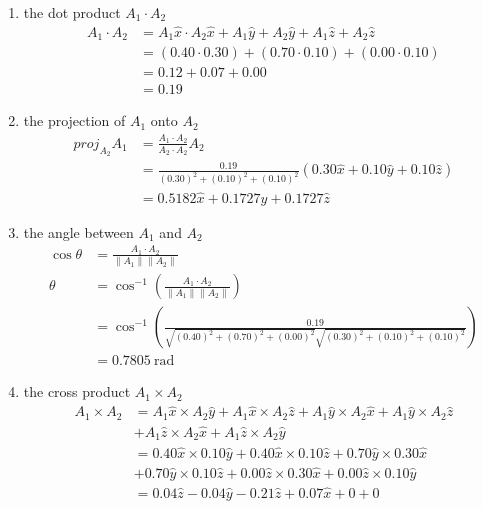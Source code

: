 \documentclass[12pt]{article}
\begin{document}
\begin{enumerate}[label=\alph*)]
    \item the dot product $A_1 \cdot A_2$
    \[
    \begin{aligned}
        A_1 \cdot A_2 &= A_1\hat{x} \cdot A_2\hat{x} + A_1\hat{y} + A_2\hat{y} + A_1\hat{z} + A_2\hat{z} \\
        &= (0.40\cdot 0.30) + (0.70 \cdot 0.10) + (0.00 \cdot 0.10) \\
        &= 0.12 + 0.07 + 0.00 \\
        &= 0.19
    \end{aligned}
    \]
    \item the projection of $A_1$ onto $A_2$ 
    \[
    \begin{aligned}
        proj_{A_2}A_1 &= \frac{A_1 \cdot A_2}{A_2 \cdot A_2} A_2 \\
        &= \frac{0.19}{(0.30)^2+(0.10)^2+(0.10)^2}(0.30\hat{x}+0.10\hat{y}+0.10\hat{z}) \\
        &= 0.5182\hat{x}+0.1727\hat{y}+0.1727\hat{z}
    \end{aligned}    
    \]
    \item the angle between $A_1$ and $A_2$
    \[
    \begin{aligned}
        \cos\theta &= \frac{A_1 \cdot A_2}{\lVert A_1 \rVert \lVert A_2 \rVert} \\
        \theta &= \cos^{-1}\left(\frac{A_1 \cdot A_2}{\lVert A_1 \rVert \lVert A_2 \rVert}\right) \\
        &= \cos^{-1}\left(\frac{0.19}{\sqrt{(0.40)^2+(0.70)^2+(0.00)^2} \sqrt{(0.30)^2+(0.10)^2+(0.10)^2}}\right) \\
        &= 0.7805 \ \text{rad}
    \end{aligned}
    \]
    \item the cross product $A_1 \times A_2$
    \[
    \begin{aligned}
        A_1 \times A_2 &= A_1\hat{x} \times A_2\hat{y} + A_1\hat{x} \times A_2\hat{z} + A_1\hat{y} \times A_2\hat{x} + A_1\hat{y} \times A_2\hat{z} \\ &+ A_1\hat{z} \times A_2\hat{x} + A_1\hat{z} \times A_2\hat{y} \\
        &= 0.40\hat{x} \times 0.10\hat{y} + 0.40\hat{x} \times 0.10\hat{z} + 0.70\hat{y} \times 0.30\hat{x} \\ &+ 0.70\hat{y} \times 0.10\hat{z} + 0.00\hat{z} \times 0.30\hat{x} + 0.00\hat{z} \times 0.10\hat{y} \\
        &= 0.04\hat{z} - 0.04\hat{y} - 0.21\hat{z} + 0.07\hat{x} + 0 + 0 \\

\end{aligned}\]
\end{enumerate}
\end{document}
